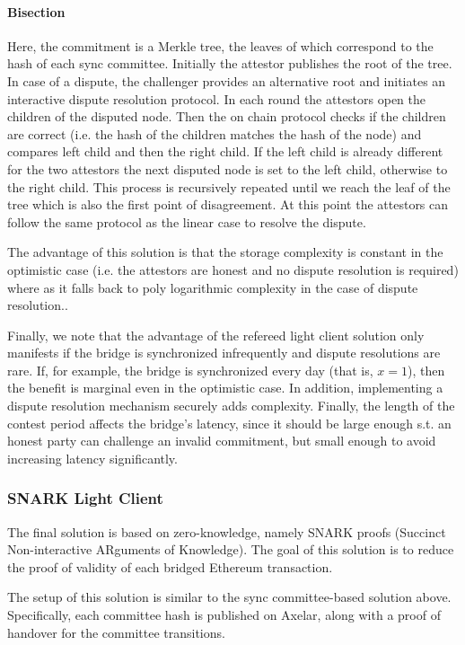 \paragraph{Bisection}
Here, the commitment is a Merkle tree, the leaves of which correspond to the hash of each
sync committee. Initially the attestor publishes the root of the tree. In case of a dispute,
the challenger provides an alternative root and initiates an interactive dispute resolution
protocol. In each round the attestors open the children of the disputed node. Then the on chain
protocol checks if the children are correct (i.e. the hash of the children matches the hash of the node)
and compares left child and then the right child. If the left child is already different for
the two attestors the next disputed node is set to the left child, otherwise to the right child.
This process is recursively repeated until we reach the leaf of the tree which is also the
first point of disagreement. At this point the attestors can follow the same protocol as the linear
case to resolve the dispute.

The advantage of this solution is that the storage complexity is constant in the optimistic case
(i.e. the attestors are honest and no dispute resolution is required) where as it falls back to
poly logarithmic complexity in the case of dispute resolution.\cite{tas2022light,agrawal2023proofs}.

Finally, we note that the advantage of the refereed light client solution only
manifests if the bridge is synchronized infrequently and dispute resolutions
are rare. If, for example, the bridge is synchronized every day (that is, $x =
1$), then the benefit is marginal even in the optimistic case. In addition,
implementing a dispute resolution mechanism securely adds complexity. Finally,
the length of the contest period affects the bridge's latency, since it should
be large enough s.t. an honest party can challenge an invalid commitment, but
small enough to avoid increasing latency significantly.

\subsubsection{SNARK Light Client}

The final solution is based on zero-knowledge, namely SNARK proofs (Succinct
Non-interactive ARguments of Knowledge). The goal of this solution is to reduce
the proof of validity of each bridged Ethereum transaction.

The setup of this solution is similar to the sync committee-based solution
above. Specifically, each committee hash is published on Axelar, along with a proof
of handover for the committee transitions.

